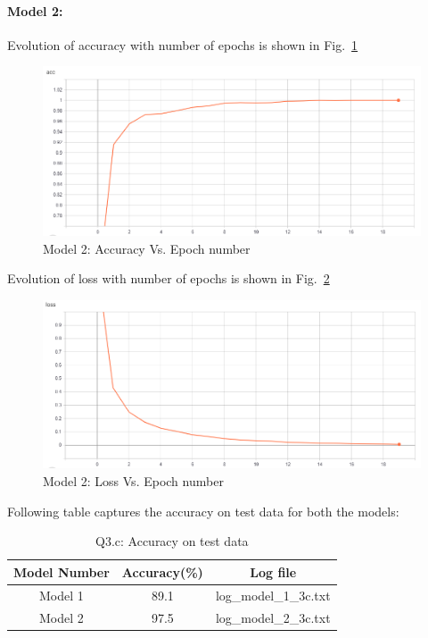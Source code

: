 \paragraph{Model 2:}Evolution of accuracy with number of epochs is shown in Fig.~\ref{fig:acc_3c_2}
\begin{figure}[h!]
	\centering
	\includegraphics[scale=0.5]{acc_model_2.png}
	\caption{Model 2: Accuracy Vs. Epoch number}
	\label{fig:acc_3c_2}
\end{figure}
Evolution of loss with number of epochs is shown in Fig.~\ref{fig:loss_3c_2}
\begin{figure}[h!]
	\centering
	\includegraphics[scale=0.5]{loss_model_2.png}
	\caption{Model 2: Loss Vs. Epoch number}
	\label{fig:loss_3c_2}
\end{figure}
\newpage
Following table captures the accuracy on test data for both the models:
\begin{table}[h!]
	\begin{center}
		\begin{tabular}{||c | c | c ||} 
			\hline
			Model Number & Accuracy(\%) & Log file\\ [0.5ex] 
			\hline\hline
			Model 1 & 89.1 & log\_model\_1\_3c.txt\\ [0.5ex]
			\hline
			Model 2 & 97.5 & log\_model\_2\_3c.txt \\ [1ex]
			\hline
		\end{tabular}
	\end{center}
	\caption{Q3.c: Accuracy on test data}
\end{table}

